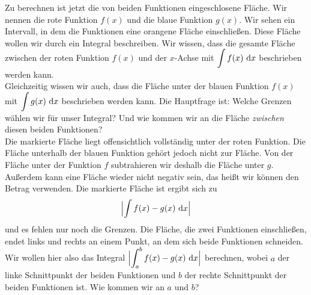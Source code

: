 \documentclass[../../main.tex]{subfiles}
\begin{document}
\begin{center}
\end{center}

Zu berechnen ist jetzt die von beiden Funktionen eingeschlosene Fläche. Wir nennen die rote Funktion $f(x)$ und die blaue Funktion $g(x)$. Wir sehen ein Intervall, in dem die Funktionen eine orangene Fläche einschließen. Diese Fläche wollen wir durch ein Integral beschreiben. Wir wissen, dass die gesamte Fläche zwischen der roten Funktion $f(x)$ und der $x$-Achse mit $\displaystyle\int f(x)\mathop{}\mathrm{d} x$ beschrieben werden kann.\\

Gleichzeitig wissen wir auch, dass die Fläche unter der blauen Funktion $f(x)$ mit $\displaystyle\int g(x)\mathop{}\mathrm{d} x$ beschrieben werden kann. Die Hauptfrage ist: Welche Grenzen wählen wir für unser Integral? Und wie kommen wir an die Fläche \textit{zwischen} diesen beiden Funktionen?\\

Die markierte Fläche liegt offensichtlich vollständig unter der roten Funktion. Die Fläche unterhalb der blauen Funktion gehört jedoch nicht zur Fläche. Von der Fläche unter der Funktion $f$ subtrahieren wir deshalb die Fläche unter $g$. Außerdem kann eine Fläche wieder nicht negativ sein, das heißt wir können den Betrag verwenden. Die markierte Fläche ist ergibt sich zu \[\Bigl|\int f(x)-g(x)\mathop{}\mathrm{d} x\Bigr|\] und es fehlen nur noch die Grenzen. Die Fläche, die zwei Funktionen einschließen, endet links und rechts an einem Punkt, an dem sich beide Funktionen schneiden. Wir wollen hier also das Integral $\Bigl|\displaystyle\int_a^b f(x)-g(x)\mathop{}\mathrm{d} x\Bigr|$ berechnen, wobei $a$ der linke Schnittpunkt der beiden Funktionen und $b$ der rechte Schnittpunkt der beiden Funktionen ist. Wie kommen wir an $a$ und $b$?\\
\end{document}
